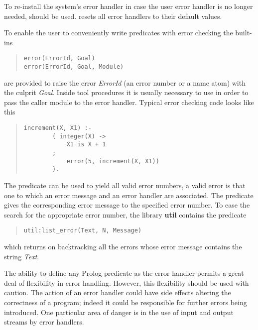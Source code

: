 To re-install the system's error handler in case the user error handler is
no longer needed,  should be used.
 resets all error handlers to their default values.

To enable the user to conveniently write predicates with error checking
the built-ins
\begin{quote}
\begin{verbatim}
error(ErrorId, Goal)
error(ErrorId, Goal, Module)
\end{verbatim}
\end{quote}
are provided to raise the error {\it ErrorId} (an error number or a name atom)
with the culprit {\it Goal}.
Inside tool procedures it is usually necessary to use 
in order to pass the caller module to the error handler.
Typical error checking code looks like this
\begin{quote}
\begin{verbatim}
increment(X, X1) :-
        ( integer(X) ->
            X1 is X + 1
        ;
            error(5, increment(X, X1))
        ).
\end{verbatim}
\end{quote}

The predicate 
can be used to yield all valid error numbers, a valid error is that one
to which an error message and an error handler are associated.
The predicate 
gives the corresponding error message to the specified error number.
To ease the search for the appropriate error number,
the library {\bf util} contains the predicate
\begin{quote}
\begin{verbatim}
util:list_error(Text, N, Message)
\end{verbatim}
\end{quote}
which returns on backtracking all the errors whose error message
contains the string {\it Text}.

The ability to define any Prolog predicate as the error handler permits a
great deal of flexibility in error handling. However, this flexibility
should be used with caution. The action of an error handler could have side
effects altering the correctness of a program; indeed it could be responsible
for further errors being introduced. One particular area of danger is in the
use of input and output streams by error handlers.



